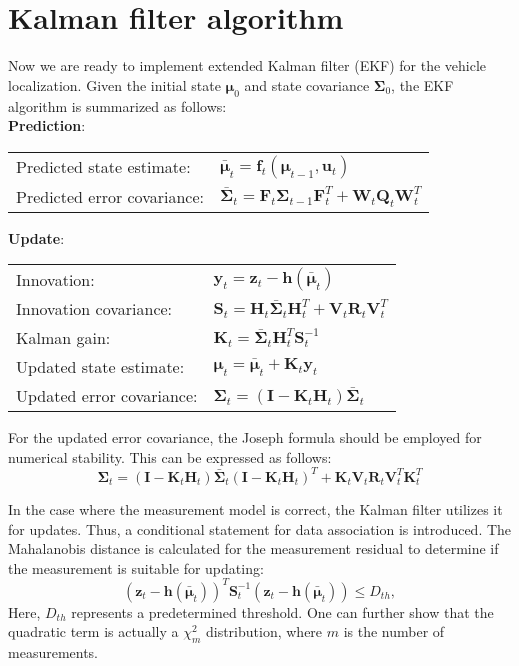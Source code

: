 \documentclass[12pt, a4paper]{article}
\begin{document}
\section{Kalman filter algorithm}
Now we are ready to implement extended Kalman filter (EKF) for the vehicle localization. Given the initial state $\bm{\mu}_{0}$ and state covariance $\bm{\Sigma}_{0}$, the EKF algorithm is summarized as follows:\\

\textbf{Prediction}:
\begin{center}
\begin{tabular}{ll}
  Predicted state estimate: & $\bar{\bm{\mu}}_{t} = \bm{f}_{t}(\bm{\mu}_{t-1}, \bm{u}_{t})$\\
  Predicted error covariance: & $\bar{\bm{\Sigma}}_{t} = \bm{F}_{t}\bm{\Sigma}_{t-1}\bm{F}_{t}^{T}+\bm{W}_{t}\bm{Q}_{t}\bm{W}_{t}^{T}$
\end{tabular}
\end{center}

\textbf{Update}:
\begin{center}
\begin{tabular}{ll}
  Innovation: & $\bm{y}_{t} = \bm{z}_{t}-\bm{h}(\bar{\bm{\mu}}_{t})$\\
  Innovation covariance: & $\bm{S}_{t} = \bm{H}_{t}\bar{\bm{\Sigma}}_{t}\bm{H}_{t}^{T}+\bm{V}_{t}\bm{R}_{t}\bm{V}_{t}^{T}$\\
  Kalman gain: & $\bm{K}_{t} = \bar{\bm{\Sigma}}_{t}\bm{H}_{t}^{T}\bm{S}_{t}^{-1}$\\
  Updated state estimate: & $\bm{\mu}_{t} = \bar{\bm{\mu}}_{t} + \bm{K}_{t}\bm{y}_{t}$\\
  Updated error covariance: & $\bm{\Sigma}_{t} = (\bm{I}-\bm{K}_{t}\bm{H}_{t})\bar{\bm{\Sigma}}_{t}$
\end{tabular}
\end{center}

For the updated error covariance, the Joseph formula should be employed for numerical stability. This can be expressed as follows:
\[
  \bm{\Sigma}_{t} = (\bm{I}-\bm{K}_{t}\bm{H}_{t})\bar{\bm{\Sigma}}_{t}(\bm{I}-\bm{K}_{t}\bm{H}_{t})^{T}+\bm{K}_{t}\bm{V}_{t}\bm{R}_{t}\bm{V}_{t}^{T}\bm{K}_{t}^{T}
\]

In the case where the measurement model is correct, the Kalman filter utilizes it for updates. Thus, a conditional statement for data association is introduced. The Mahalanobis distance is calculated for the measurement residual to determine if the measurement is suitable for updating:
\[
  (\bm{z}_{t}-\bm{h}(\bar{\bm{\mu}}_{t}))^{T}\bm{S}_{t}^{-1}(\bm{z}_{t}-\bm{h}(\bar{\bm{\mu}}_{t})) \leq D_{th},
\]
Here, $D_{th}$ represents a predetermined threshold. One can further show that the quadratic term is actually a $\chi_{m}^{2}$ distribution, where $m$ is the number of measurements.
\end{document}
